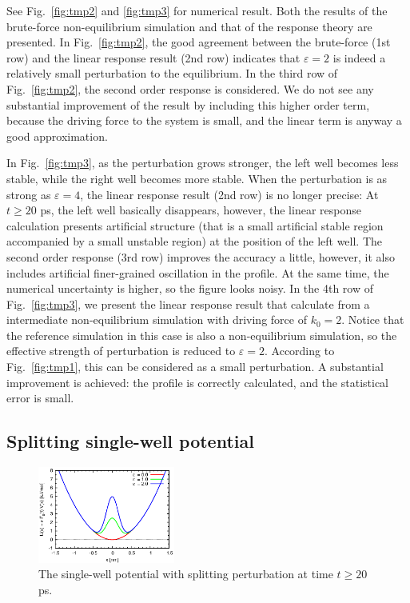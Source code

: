 \documentclass[aip,jcp,a4paper,reprint,onecolumn]{revtex4-1}
\newcommand{\eps}{\varepsilon}
\begin{document}
See Fig.~\ref{fig:tmp2} and \ref{fig:tmp3} for numerical result.  Both
the results of the brute-force non-equilibrium simulation
and that of the response theory are presented.
In Fig.~\ref{fig:tmp2},
the good agreement between the brute-force (1st row)
and the linear response result (2nd row) indicates that $\eps = 2$ is
indeed a relatively small perturbation to the equilibrium.
In the third row of Fig.~\ref{fig:tmp2},
the second order response is considered. We do not see any
substantial improvement of the result by including this higher order term,
because the
driving force to the system is small,
and the linear term is anyway a good approximation.

In Fig.~\ref{fig:tmp3}, as the
perturbation grows stronger, the left well becomes less stable, while
the right well becomes more stable.  When the perturbation is as strong as
$\eps = 4$, the linear response result (2nd row) is no
longer precise:
At $t\geq 20$ \textsf{ps}, the left well basically
disappears, however, the linear response calculation presents
artificial structure (that is a small artificial
stable region accompanied by a small unstable region)
at the position of the left well.
The second order response (3rd row) improves the accuracy a little, 
however, it also includes artificial finer-grained oscillation in the profile.
At the same time, the numerical uncertainty is higher, so the figure
looks noisy.
In the 4th row of Fig.~\ref{fig:tmp3}, we present the linear response result
that calculate from 
a intermediate
non-equilibrium simulation with driving force of $k_0 = 2$.
Notice that the reference simulation in this case is also a
non-equilibrium simulation, so the effective strength of perturbation
is reduced to $\eps = 2$. According to Fig.~\ref{fig:tmp1}, this can be
considered as a small perturbation.
A substantial improvement is achieved: the profile
is correctly calculated, and the statistical error is small.



\subsection{Splitting single-well potential}

\begin{figure}
  \centering
  \includegraphics[width=0.4\textwidth]{figs/fig-split-pot.eps}
  \caption{The single-well potential with splitting perturbation at
    time $t\geq 20$ ps.}
  \label{fig:tmp4}
\end{figure}
\end{document}
